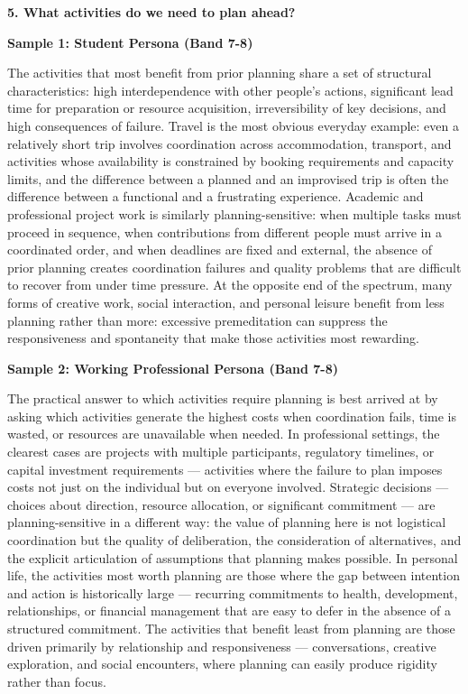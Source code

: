 \separator

\begin{ieltsquestion}
\textbf{5. What activities do we need to plan ahead?}
\end{ieltsquestion}
\textbf{Sample 1: Student Persona (Band 7-8)}

The activities that most benefit from prior planning share a set of structural characteristics: high interdependence with other people's actions, significant lead time for preparation or resource acquisition, irreversibility of key decisions, and high consequences of failure. Travel is the most obvious everyday example: even a relatively short trip involves coordination across accommodation, transport, and activities whose availability is constrained by booking requirements and capacity limits, and the difference between a planned and an improvised trip is often the difference between a functional and a frustrating experience. Academic and professional project work is similarly planning-sensitive: when multiple tasks must proceed in sequence, when contributions from different people must arrive in a coordinated order, and when deadlines are fixed and external, the absence of prior planning creates coordination failures and quality problems that are difficult to recover from under time pressure. At the opposite end of the spectrum, many forms of creative work, social interaction, and personal leisure benefit from less planning rather than more: excessive premeditation can suppress the responsiveness and spontaneity that make those activities most rewarding.

\textbf{Sample 2: Working Professional Persona (Band 7-8)}

The practical answer to which activities require planning is best arrived at by asking which activities generate the highest costs when coordination fails, time is wasted, or resources are unavailable when needed. In professional settings, the clearest cases are projects with multiple participants, regulatory timelines, or capital investment requirements — activities where the failure to plan imposes costs not just on the individual but on everyone involved. Strategic decisions — choices about direction, resource allocation, or significant commitment — are planning-sensitive in a different way: the value of planning here is not logistical coordination but the quality of deliberation, the consideration of alternatives, and the explicit articulation of assumptions that planning makes possible. In personal life, the activities most worth planning are those where the gap between intention and action is historically large — recurring commitments to health, development, relationships, or financial management that are easy to defer in the absence of a structured commitment. The activities that benefit least from planning are those driven primarily by relationship and responsiveness — conversations, creative exploration, and social encounters, where planning can easily produce rigidity rather than focus.

